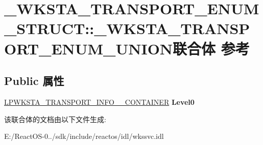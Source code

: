 \hypertarget{union___w_k_s_t_a___t_r_a_n_s_p_o_r_t___e_n_u_m___s_t_r_u_c_t_1_1___w_k_s_t_a___t_r_a_n_s_p_o_r_t___e_n_u_m___u_n_i_o_n}{}\section{\+\_\+\+W\+K\+S\+T\+A\+\_\+\+T\+R\+A\+N\+S\+P\+O\+R\+T\+\_\+\+E\+N\+U\+M\+\_\+\+S\+T\+R\+U\+CT\+:\+:\+\_\+\+W\+K\+S\+T\+A\+\_\+\+T\+R\+A\+N\+S\+P\+O\+R\+T\+\_\+\+E\+N\+U\+M\+\_\+\+U\+N\+I\+O\+N联合体 参考}
\label{union___w_k_s_t_a___t_r_a_n_s_p_o_r_t___e_n_u_m___s_t_r_u_c_t_1_1___w_k_s_t_a___t_r_a_n_s_p_o_r_t___e_n_u_m___u_n_i_o_n}
\subsection*{Public 属性}
\begin{DoxyCompactItemize}
\item 
\mbox{\label{union___w_k_s_t_a___t_r_a_n_s_p_o_r_t___e_n_u_m___s_t_r_u_c_t_1_1___w_k_s_t_a___t_r_a_n_s_p_o_r_t___e_n_u_m___u_n_i_o_n_a5b05999bf5afb0eb6d262b6b54b92702}} 
\hyperlink{struct___w_k_s_t_a___t_r_a_n_s_p_o_r_t___i_n_f_o__0___c_o_n_t_a_i_n_e_r}{L\+P\+W\+K\+S\+T\+A\+\_\+\+T\+R\+A\+N\+S\+P\+O\+R\+T\+\_\+\+I\+N\+F\+O\+\_\+\_\+\+C\+O\+N\+T\+A\+I\+N\+ER} {\bfseries Level0}
\end{DoxyCompactItemize}


该联合体的文档由以下文件生成\+:\begin{DoxyCompactItemize}
\item 
E\+:/\+React\+O\+S-\/0../sdk/include/reactos/idl/wkssvc.\+idl\end{DoxyCompactItemize}
